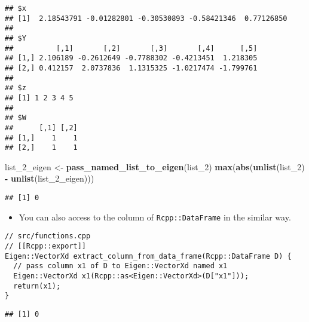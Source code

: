 \documentclass[
]{book}
\newenvironment{Shaded}{\begin{snugshade}}{\end{snugshade}}
\newcommand{\CommentTok}[1]{\textcolor[rgb]{0.56,0.35,0.01}{\textit{#1}}}
\newcommand{\FunctionTok}[1]{\textcolor[rgb]{0.13,0.29,0.53}{\textbf{#1}}}
\newcommand{\NormalTok}[1]{#1}
\newcommand{\OtherTok}[1]{\textcolor[rgb]{0.56,0.35,0.01}{#1}}
\newcommand{\SpecialCharTok}[1]{\textcolor[rgb]{0.81,0.36,0.00}{\textbf{#1}}}
\providecommand{\tightlist}{%
  \setlength{\itemsep}{0pt}\setlength{\parskip}{0pt}}
\begin{document}
\begin{verbatim}
## $x
## [1]  2.18543791 -0.01282801 -0.30530893 -0.58421346  0.77126850
## 
## $Y
##          [,1]       [,2]       [,3]       [,4]      [,5]
## [1,] 2.106189 -0.2612649 -0.7788302 -0.4213451  1.218305
## [2,] 0.412157  2.0737836  1.1315325 -1.0217474 -1.799761
## 
## $z
## [1] 1 2 3 4 5
## 
## $W
##      [,1] [,2]
## [1,]    1    1
## [2,]    1    1
\end{verbatim}

\begin{Shaded}
\begin{Highlighting}[]
\NormalTok{list\_2\_eigen }\OtherTok{\textless{}{-}} \FunctionTok{pass\_named\_list\_to\_eigen}\NormalTok{(list\_2)}
\FunctionTok{max}\NormalTok{(}\FunctionTok{abs}\NormalTok{(}\FunctionTok{unlist}\NormalTok{(list\_2) }\SpecialCharTok{{-}} \FunctionTok{unlist}\NormalTok{(list\_2\_eigen)))}
\end{Highlighting}
\end{Shaded}

\begin{verbatim}
## [1] 0
\end{verbatim}

\begin{itemize}
\tightlist
\item
  You can also access to the column of \texttt{Rcpp::DataFrame} in the similar way.
\end{itemize}

\begin{verbatim}
// src/functions.cpp
// [[Rcpp::export]]
Eigen::VectorXd extract_column_from_data_frame(Rcpp::DataFrame D) {
  // pass column x1 of D to Eigen::VectorXd named x1
  Eigen::VectorXd x1(Rcpp::as<Eigen::VectorXd>(D["x1"]));
  return(x1);
}
\end{verbatim}

\begin{Shaded}
\end{Shaded}

\begin{verbatim}
## [1] 0
\end{verbatim}
\end{document}
